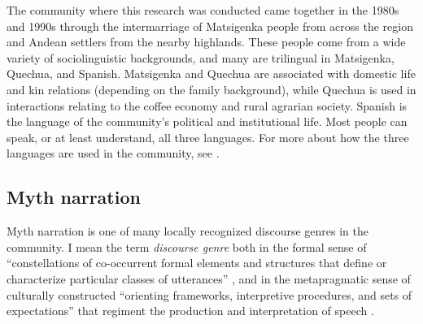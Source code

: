 \documentclass[output=paper]{LSP/langsci}
\begin{document}
The community where this research was conducted came together in the 1980s and 1990s through the intermarriage of Matsigenka people from across the region and Andean settlers from the nearby highlands. These people come from a wide variety of sociolinguistic backgrounds, and many are trilingual in Matsigenka, Quechua, and Spanish. Matsigenka and Quechua are associated with domestic life and kin relations (depending on the family background), while Quechua is used in interactions relating to the coffee economy and rural agrarian society. Spanish is the language of the community’s political and institutional life. Most people can speak, or at least understand, all three languages. For more about how the three languages are used in the community, see \citet{emlen14,emlen.2015, emlen.2017}.
 
\subsection{Myth narration}
\label{Emmyth-narr}
Myth narration is one of many locally recognized discourse genres in the community. I mean the term \textit{discourse genre} both in the formal sense of ``constellations of co-occurrent formal elements and structures that define or characterize particular classes of utterances''  \citep[][141]{briggs.1992}, and in the metapragmatic sense of culturally constructed ``orienting frameworks, interpretive procedures, and sets of expectations'' \citep[][670]{hanks.1987} that regiment the production and interpretation of speech  \citep[see also][]{bakhtin86,silverstein93}.  
\end{document}
